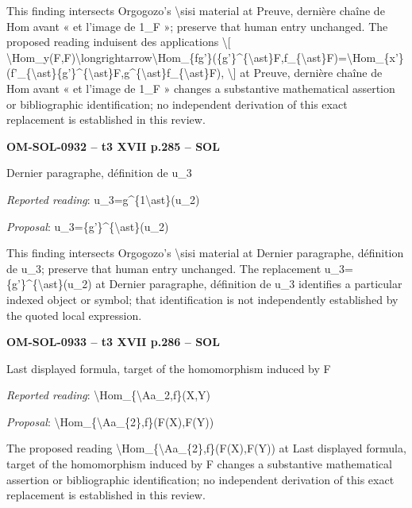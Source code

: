 This finding intersects Orgogozo's \textbackslash{}sisi material at Preuve, dernière chaîne de Hom avant « et l'image de 1\_F »; preserve that human entry unchanged. The proposed reading induisent des applications \textbackslash{}[ \textbackslash{}Hom\_y(F,F)\textbackslash{}longrightarrow\textbackslash{}Hom\_\{fg'\}(\{g'\}\textasciicircum{}\{\textbackslash{}ast\}F,f\_\{\textbackslash{}ast\}F)=\allowbreak \textbackslash{}Hom\_\{x'\}(f'\_\{\textbackslash{}ast\}\{g'\}\textasciicircum{}\{\textbackslash{}ast\}F,g\textasciicircum{}\{\textbackslash{}ast\}f\_\{\textbackslash{}ast\}F), \textbackslash{}] at Preuve, dernière chaîne de Hom avant « et l'image de 1\_F » changes a substantive mathematical assertion or bibliographic identification; no independent derivation of this exact replacement is established in this review.\par
\par\noindent\textbf{OM-SOL-0932 -- t3 XVII p.285 -- SOL}\par
Dernier paragraphe, définition de u\_3\par
\emph{Reported reading}: u\_3=\allowbreak g\textasciicircum{}\{1\textbackslash{}ast\}(u\_2)\par
\emph{Proposal}: u\_3=\allowbreak \{g'\}\textasciicircum{}\{\textbackslash{}ast\}(u\_2)\par
This finding intersects Orgogozo's \textbackslash{}sisi material at Dernier paragraphe, définition de u\_3; preserve that human entry unchanged. The replacement u\_3=\allowbreak \{g'\}\textasciicircum{}\{\textbackslash{}ast\}(u\_2) at Dernier paragraphe, définition de u\_3 identifies a particular indexed object or symbol; that identification is not independently established by the quoted local expression.\par
\par\noindent\textbf{OM-SOL-0933 -- t3 XVII p.286 -- SOL}\par
Last displayed formula, target of the homomorphism induced by F\par
\emph{Reported reading}: \textbackslash{}Hom\_\{\textbackslash{}Aa\_2,f\}(X,Y)\par
\emph{Proposal}: \textbackslash{}Hom\_\{\textbackslash{}Aa\_\{2\},f\}(F(X),F(Y))\par
The proposed reading \textbackslash{}Hom\_\{\textbackslash{}Aa\_\{2\},f\}(F(X),F(Y)) at Last displayed formula, target of the homomorphism induced by F changes a substantive mathematical assertion or bibliographic identification; no independent derivation of this exact replacement is established in this review.\par
